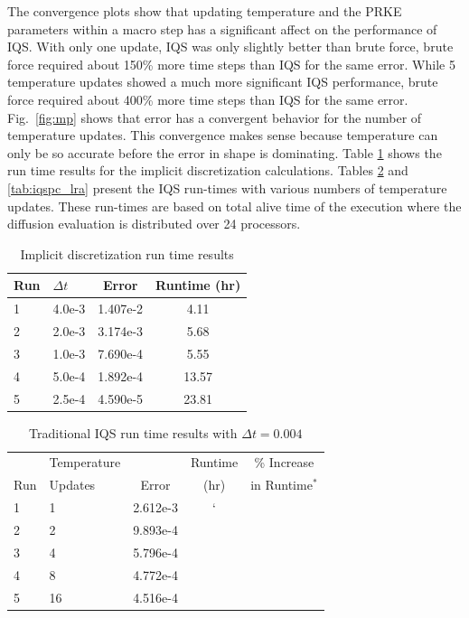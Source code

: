 \documentclass{anstrans}
\newcommand{\fig}[1]{Fig.~\ref{#1}}                      %
\begin{document}
The convergence plots show that updating temperature and the PRKE parameters within a macro step has a significant affect on the performance of IQS.  With only one update, IQS was only slightly better than brute force, brute force required about 150\% more time steps than IQS for the same error.  While 5 temperature updates showed a much more significant IQS performance, brute force required about 400\% more time steps than IQS for the same error.  \fig{fig:mp} shows that error has a convergent behavior for the number of temperature updates.  This convergence makes sense because temperature can only be so accurate before the error in shape is dominating. Table \ref{tab:ndiff_lra} shows the run time results for the implicit discretization calculations.  Tables \ref{tab:iqs_lra} and \ref{tab:iqspc_lra} present the IQS run-times with various numbers of temperature updates.  These run-times are based on total alive time of the execution where the diffusion evaluation is distributed over 24 processors. \\

\begin{table}[!htbp]
\begin{center}
\begin{tabular}{|l|l|cc|}
\hline
Run  &  $\Delta t$ & Error & Runtime (hr) \\
\hline
1	& 4.0e-3	& 1.407e-2 	& 4.11	\\
2	& 2.0e-3	& 3.174e-3 	& 5.68 	\\
3 	& 1.0e-3 	& 7.690e-4 	& 5.55	\\
4 	& 5.0e-4 	& 1.892e-4 	& 13.57	\\
5 	& 2.5e-4	& 4.590e-5 	& 23.81	\\
\hline
\end{tabular}
\end{center}
\caption{Implicit discretization run time results}
\label{tab:ndiff_lra}
\end{table}

\begin{table}[!htbp]
\begin{center}
\begin{tabular}{|l|l|ccc|}
\hline
	&  Temperature 	&  		& Runtime 	& \% Increase	\\
Run	&  Updates 	& Error & (hr)		& in Runtime$^*$\\
\hline
1	& 1		& 2.612e-3 	&  `&	\\
2	& 2		& 9.893e-4 	& 	& 	\\
3 	& 4 	& 5.796e-4 	& 	&	\\
4 	& 8 	& 4.772e-4 	& 	&	\\
5 	& 16	& 4.516e-4 	& 	&	\\
\hline
\end{tabular}
\end{center}
\caption{Traditional IQS run time results with $\Delta t = 0.004$}
\label{tab:iqs_lra}
\end{table}
\end{document}
